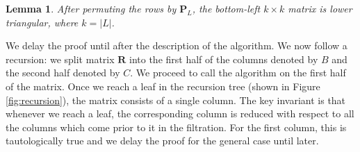 \documentclass{article}
\newtheorem{lemma}[theorem]{Lemma}
\newcommand{\matsize}[2]{#1\times #2}
\newcommand{\mat}[1]{\mathbf{#1}}
\begin{document}
\begin{lemma}\label{lem:triangular}
    After permuting the rows by $\mat{P}_L$, the bottom-left $\matsize{k}{k}$ matrix is lower triangular, where $k = |L|$.
\end{lemma}
We delay the proof until after the description of the algorithm.  We now follow a recursion: we split matrix $\mat{R}$ into  the
first half of the columns denoted by $B$ and the second half denoted by $C$. We proceed to call the
algorithm on the first half of the matrix. Once we reach a leaf in the
recursion tree (shown in Figure \ref{fig:recursion}), the matrix consists of a single column. The key invariant is that whenever we
reach a leaf, the corresponding column is reduced with respect to all the columns which come prior to
it in the filtration. For the first column, this is tautologically true and we delay the proof for the general case until later.
%
\end{document}
